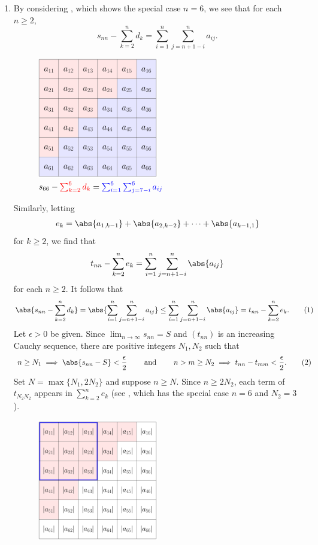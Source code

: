 \documentclass{lew98_solutions}
\begin{document}
\begin{solution}
\begin{enumerate}
        \item By considering , which shows the special case \( n = 6 \), we see that for each \( n \geq 2 \),
        \[
            s_{nn} - \sum_{k=2}^n d_k = \sum_{i=1}^n \sum_{j=n+1-i}^n a_{ij}.
        \]
        \begin{figure}[H]
            \centering
            \includegraphics[width=0.5\textwidth]{UA_Figures/UA_ex2_8_6_fig_1.pdf}
            \caption{\( s_{66} - \textcolor{red}{\sum_{k=2}^6 d_k} = \textcolor{blue}{\sum_{i=1}^6 \sum_{j=7-i}^6 a_{ij}} \)}
            \label{fig:ex2.8.6_1}
        \end{figure}
        \noindent Similarly, letting
        \[
            e_k = \abs{a_{1,k-1}} + \abs{a_{2,k-2}} + \cdots + \abs{a_{k-1,1}}
        \]
        for \( k \geq 2 \), we find that
        \[
            t_{nn} - \sum_{k=2}^n e_k = \sum_{i=1}^n \sum_{j=n+1-i}^n \abs{a_{ij}}
        \]
        for each \( n \geq 2 \). It follows that
        \[
            \abs{s_{nn} - \sum_{k=2}^n d_k} = \abs{\sum_{i=1}^n \sum_{j=n+1-i}^n a_{ij}} \leq \sum_{i=1}^n \sum_{j=n+1-i}^n \abs{a_{ij}} = t_{nn} - \sum_{k=2}^n e_k. \tag{1}
        \]
        Let \( \epsilon > 0 \) be given. Since \( \lim_{n \to \infty} s_{nn} = S \) and \( (t_{nn}) \) is an increasing Cauchy sequence, there are positive integers \( N_1, N_2 \) such that
        \[
            n \geq N_1 \implies \abs{s_{nn} - S} < \frac{\epsilon}{2} \hspaceand n > m \geq N_2 \implies t_{nn} - t_{mm} < \frac{\epsilon}{2}. \tag{2}
        \]
        Set \( N = \max \{ N_1, 2 N_2 \} \) and suppose \( n \geq N \). Since \( n \geq 2 N_2 \), each term of \( t_{N_2 N_2} \) appears in \( \sum_{k=2}^n e_k \) (see , which has the special case \( n = 6 \) and \( N_2 = 3 \)).
        \begin{figure}[H]
            \centering
            \includegraphics[width=0.5\textwidth]{UA_Figures/UA_ex2_8_6_fig_2.pdf}

\end{figure}
\end{enumerate}
\end{solution}
\end{document}
